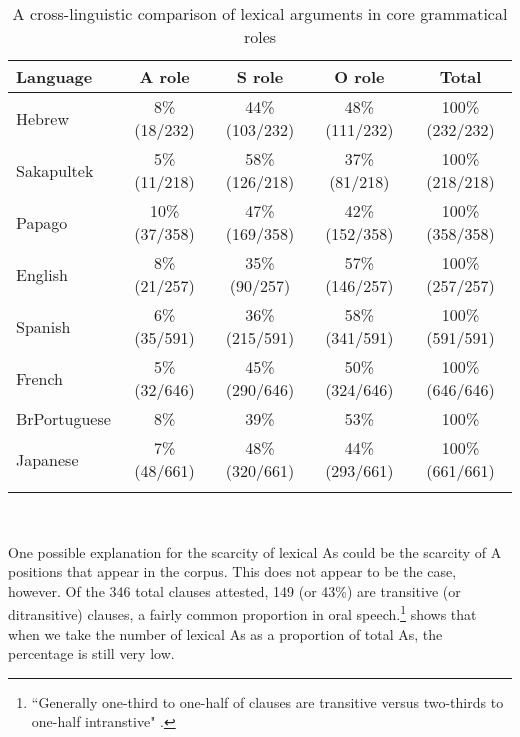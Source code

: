 \begin{table}

\caption{{A cross-linguistic comparison of lexical arguments in core grammatical roles}} 
\begin{tabular}{ l  c  c  c  c }
\lsptoprule
Language & A role & S role & O role & Total\\

\midrule
 Hebrew & 8{\%} (18/232) & 44{\%}(103/232) & 48{\%} (111/232) & 100{\%} (232/232) \\
  
 
 Sakapultek & 5{\%} (11/218) & 58{\%} (126/218)  & 37{\%} (81/218) &  100{\%} (218/218)  \\

 
Papago & 10{\%} (37/358) & 47{\%} (169/358)  & 42{\%} (152/358)  &  100{\%} (358/358) \\

 
English & 8{\%} (21/257) & 35{\%} (90/257)  & 57{\%} (146/257)  &  100{\%} (257/257) \\

 
Spanish & 6{\%} (35/591) & 36{\%} (215/591)  & 58{\%} (341/591)  &  100{\%} (591/591) \\

 
French & 5{\%} (32/646) & 45{\%} (290/646)  & 50{\%} (324/646)  &  100{\%} (646/646)  \\
 
 
BrPortuguese & 8{\%}  & 39{\%}   & 53{\%}   &  100{\%}  \\

 
Japanese & 7{\%} (48/661) & 48{\%} (320/661)  & 44{\%} (293/661)  &  100{\%} (661/661) \\

\lspbottomrule
\end{tabular}\\
\label{crossgeneraldist}

\end{table}


One possible explanation for the scarcity of lexical As could be the scarcity of A positions that appear in the corpus. This does not appear to be the case, however. Of the 346 total clauses attested, 149 (or 43{\%}) are transitive (or ditransitive) clauses, a fairly common proportion in oral speech.\footnote{``Generally one-third to one-half of clauses are transitive versus two-thirds to one-half intranstive"  \citep[63-64]{dubois2003a}.}  shows that when we take the number of lexical As as a proportion of total As, the percentage is still very low.

